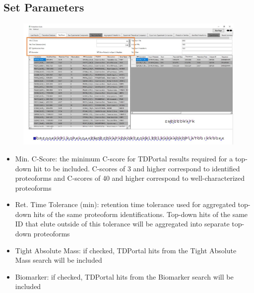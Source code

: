 \subsection{Set Parameters}
\begin{figure}[h]
\centering
\includegraphics[scale=0.42]{figures/topdown1.jpg}
\end{figure}
\begin{itemize}
\item Min. C-Score: the minimum C-score\supercite{LeDuc2014} for TDPortal results required for a top-down hit to be included. C-scores of 3 and higher correspond to identified proteoforms and C-scores of 40 and higher correspond to well-characterized proteoforms
\item Ret. Time Tolerance (min): retention time tolerance used for aggregated top-down hits of the same proteoform identifications. Top-down hits of the same ID that elute outside of this tolerance will be aggregated into separate top-down proteoforms
\item Tight Absolute Mass: if checked, TDPortal hits from the Tight Absolute Mass search will be included
\item Biomarker: if checked, TDPortal hits from the Biomarker search will be included
\end{itemize}

